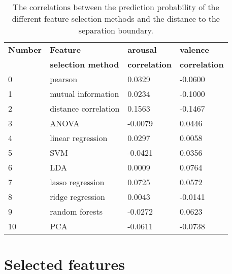 \begin{table}[H]
\centering
\begin{tabular}{llll}
\textbf{Number} & \textbf{Feature}        & \textbf{arousal} & \textbf{valence} \\
                & \textbf{selection method} & \textbf{correlation} & \textbf{correlation}\\ \hline
0               & pearson              & 0.0329           & -0.0600 \\
1               & mutual information   & 0.0234           & -0.1000 \\
2               & distance correlation & 0.1563           & -0.1467 \\
3               & ANOVA                & -0.0079          & 0.0446  \\
4               & linear regression    & 0.0297           & 0.0058  \\
5               & SVM                  & -0.0421          & 0.0356  \\
6               & LDA                  & 0.0009           & 0.0764  \\
7               & lasso regression     & 0.0725           & 0.0572  \\
8               & ridge regression     & 0.0043           & -0.0141 \\
9               & random forests       & -0.0272          & 0.0623  \\
10              & PCA                  & -0.0611          & -0.0738
\end{tabular}
\caption{The correlations between the prediction probability of the different feature selection methods and the distance to the separation boundary\label{corrsCompLblGen}.}
\end{table}




\section{Selected features}

